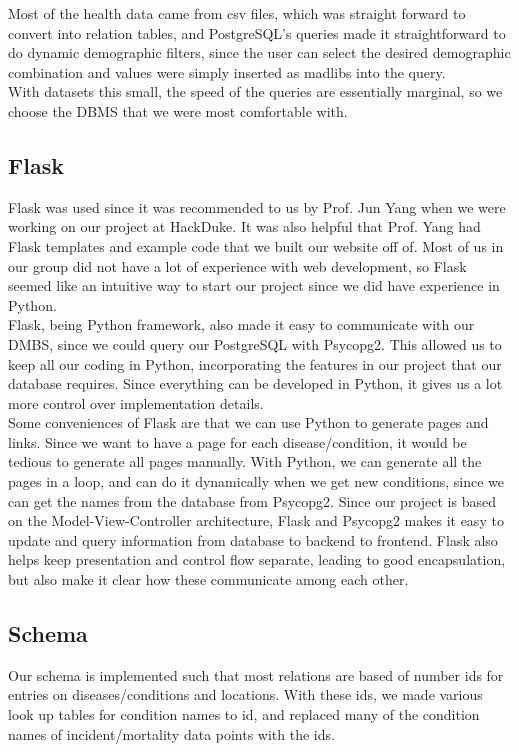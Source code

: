 \documentclass[12pt]{article}
\begin{document}
Most of the health data came from csv files, which was straight forward to convert into relation tables, and PostgreSQL's queries made it straightforward to do dynamic demographic filters, since the user can select the desired demographic combination and values were simply inserted as madlibs into the query.\\

With datasets this small, the speed of the queries are essentially marginal, so we choose the DBMS that we were most comfortable with.\\
\subsection{Flask}
Flask was used since it was recommended to us by Prof. Jun Yang when we were working on our project at HackDuke. It was also helpful that Prof. Yang had Flask templates and example code that we built our website off of. Most of us in our group did not have a lot of experience with web development, so Flask seemed like an intuitive way to start our project since we did have experience in Python.\\

Flask, being Python framework, also made it easy to communicate with our DMBS, since we could query our PostgreSQL with Psycopg2. This allowed us to keep all our coding in Python, incorporating the features in our project that our database requires. Since everything can be developed in Python, it gives us a lot more control over implementation details.\\

Some conveniences of Flask are that we can use Python to generate pages and links. Since we want to have a page for each disease/condition, it would be tedious to generate all pages manually. With Python, we can generate all the pages in a loop, and can do it dynamically when we get new conditions, since we can get the names from the database from Psycopg2. Since our project is based on the Model-View-Controller architecture, Flask and Psycopg2 makes it easy to update and query information from database to backend to frontend. Flask also helps keep presentation and control flow separate, leading to good encapsulation, but also make it clear how these communicate among each other.\\
\subsection{Schema}
Our schema is implemented such that most relations are based of number ids for entries on diseases/conditions and locations. With these ids, we made various look up tables for condition names to id, and replaced many of the condition names of incident/mortality data points with the ids. \\
\end{document}
